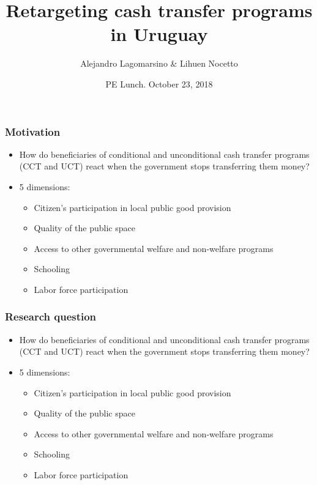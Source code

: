 \documentclass{beamer}
\title[Retargeting cash transfers programs] %
{Retargeting cash transfer programs in Uruguay}
\author[Alejandro Lagomarsino] %
{Alejandro Lagomarsino \& Lihuen Nocetto\inst{*} }
\institute[Harvard University] %
{
	\inst{*}%
	Harvard University\\
	Pontifical Catholic University of Chile
}
\date[October. 2018] %
{PE Lunch. October 23, 2018}
\begin{document}
	\setlength{\parindent}{10pt}
	
	\frame{\titlepage}

\begin{frame}
\frametitle{Motivation}
\begin{itemize}
	\item How do beneficiaries of conditional and unconditional cash transfer programs (CCT and UCT) react when the government stops transferring them money?
	\item 5 dimensions:
	\begin{itemize}
		\item Citizen's participation in local public good provision
		\item Quality of the public space
		\item Access to other governmental welfare and non-welfare programs
		\item Schooling
		\item Labor force participation
	\end{itemize}
\end{itemize}
\end{frame}


\begin{frame}
		\frametitle{Research question}
		\begin{itemize}
			\item How do beneficiaries of conditional and unconditional cash transfer programs (CCT and UCT) react when the government stops transferring them money?
			\item 5 dimensions:
			\begin{itemize}
				\item Citizen's participation in local public good provision
				\item Quality of the public space
				\item Access to other governmental welfare and non-welfare programs
				\item Schooling
				\item Labor force participation
			\end{itemize}
		\end{itemize}
\end{frame}
\end{document}
